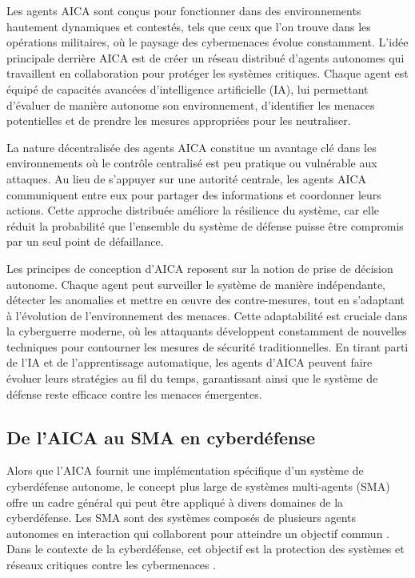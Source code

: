 Les agents AICA sont conçus pour fonctionner dans des environnements hautement dynamiques et contestés, tels que ceux que l'on trouve dans les opérations militaires, où le paysage des cybermenaces évolue constamment. L'idée principale derrière AICA est de créer un réseau distribué d'agents autonomes qui travaillent en collaboration pour protéger les systèmes critiques. Chaque agent est équipé de capacités avancées d'intelligence artificielle (IA), lui permettant d'évaluer de manière autonome son environnement, d'identifier les menaces potentielles et de prendre les mesures appropriées pour les neutraliser.

La nature décentralisée des agents AICA constitue un avantage clé dans les environnements où le contrôle centralisé est peu pratique ou vulnérable aux attaques. Au lieu de s'appuyer sur une autorité centrale, les agents AICA communiquent entre eux pour partager des informations et coordonner leurs actions. Cette approche distribuée améliore la résilience du système, car elle réduit la probabilité que l'ensemble du système de défense puisse être compromis par un seul point de défaillance.

Les principes de conception d'AICA reposent sur la notion de prise de décision autonome. Chaque agent peut surveiller le système de manière indépendante, détecter les anomalies et mettre en œuvre des contre-mesures, tout en s'adaptant à l'évolution de l'environnement des menaces. Cette adaptabilité est cruciale dans la cyberguerre moderne, où les attaquants développent constamment de nouvelles techniques pour contourner les mesures de sécurité traditionnelles. En tirant parti de l'IA et de l'apprentissage automatique, les agents d'AICA peuvent faire évoluer leurs stratégies au fil du temps, garantissant ainsi que le système de défense reste efficace contre les menaces émergentes.

\subsection{De l'AICA au SMA en cyberdéfense}

Alors que l'AICA fournit une implémentation spécifique d'un système de cyberdéfense autonome, le concept plus large de systèmes multi-agents (SMA) offre un cadre général qui peut être appliqué à divers domaines de la cyberdéfense. Les SMA sont des systèmes composés de plusieurs agents autonomes en interaction qui collaborent pour atteindre un objectif commun \cite{kott2018towards}. Dans le contexte de la cyberdéfense, cet objectif est la protection des systèmes et réseaux critiques contre les cybermenaces \cite{jajodia2017autonomous}.

